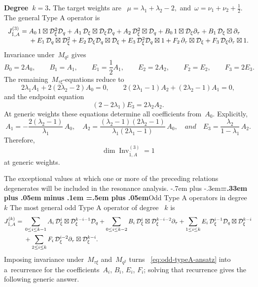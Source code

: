 \documentclass[12pt,a4paper]{amsart}
\makeatletter
\providecommand{\headspaces}{\spaceskip=.33em plus .05em minus .1em \xspaceskip=.5em plus .05em}
\def\subsubsection{\@startsection{subsubsection}{3}{0pt}{-1ex \@plus -.4ex \@minus -.2ex}%
  {-.7em plus -.3em}{\normalfont\normalsize\bfseries\boldmath\headspaces}}
\theoremstyle{thm}
\theoremstyle{definition}
\newcommand {\Dq}{\cD_q}
\newcommand {\Dxi}{\cD_\xi}
\makeatother
\begin{document}
{\bf Degree~\(k=3\).} The target weights are~%
$
\mu=\lambda_1+\lambda_2-2,
$ and~$\omega=\nu_1+\nu_2+\frac12.$ The general Type A operator is
\[
\begin{array}{r@{}l}
J_{\bar1,A}^{(3)}
={}&
A_0\,1\boxtimes \Dxi^2\Dq
+
A_1\,\Dxi\boxtimes \Dxi\Dq
+
A_2\,\Dxi^2\boxtimes \Dq
+
B_0\,1\boxtimes \Dxi\partial_\tau
+
B_1\,\Dxi\boxtimes \partial_\tau
\\
&{}+
E_1\,\Dq\boxtimes \Dxi^2
+
E_2\,\Dxi\Dq\boxtimes \Dxi
+
E_3\,\Dxi^2\Dq\boxtimes1
+
F_2\,\partial_\tau\boxtimes \Dxi
+
F_3\,\Dxi\partial_\tau\boxtimes1.
\end{array}
\]
Invariance under~\(M_{q^2}\) gives
\[
B_0=2A_0,
\qquad
B_1=A_1,
\qquad
E_1=\frac12A_1,
\qquad
E_2=2A_2,
\qquad
F_2=E_2,
\qquad
F_3=2E_3.
\]
The remaining~\(M_{\tau\xi}\)-equations reduce to
\[
2\lambda_1A_1
+
2(2\lambda_2-2)A_0
=
0,
\qquad
2(2\lambda_1-1)A_2
+
(2\lambda_2-1)A_1
=
0,
\]
and the endpoint equation
\[
(2-2\lambda_1)E_3
=
2\lambda_2A_2.
\]
At generic weights these equations determine all coefficients from~\(A_0\). Explicitly,
\[
A_1
=
-\frac{2(\lambda_2-1)}{\lambda_1}\,A_0,
\quad
A_2
=
\frac{
(\lambda_2-1)(2\lambda_2-1)
}{
\lambda_1(2\lambda_1-1)
}\,A_0,
\quad { and } \quad
E_3
=
\frac{\lambda_2}{1-\lambda_1}\,A_2.
\]
Therefore,
\[
\dim\operatorname{Inv}_{\bar1,A}^{(3)}=1
\]
at generic weights.

The exceptional values at which one or more of the preceding
relations degenerates will be included in the resonance analysis.
\subsubsection{Odd Type A operators in degree $k$}
The most general odd Type A operator of degree~%
\(k\) is
\begin{align}
J_{\bar1,A}^{(k)}
={}&
\sum_{0\leq i\leq k-1}
A_i\,\Dxi^i\boxtimes \Dxi^{k-i-1}\Dq
+
\sum_{0\leq i\leq k-2}
B_i\,\Dxi^i\boxtimes \Dxi^{k-i-2}\partial_\tau
\nonumber+
\sum_{1\leq i\leq k}
E_i\,\Dxi^{i-1}\Dq\boxtimes \Dxi^{k-i}
\\& +
\sum_{2\leq i\leq k}
F_i\,\Dxi^{i-2}\partial_\tau\boxtimes \Dxi^{k-i}.
\label{eq:odd-typeA-ansatz}
\end{align}
Imposing invariance under~\(M_{\tau\xi}\) and~\(M_{q^2}\) turns~%
\eqref{eq:odd-typeA-ansatz} into a~recurrence for the coefficients~\(A_i\),
\(B_i\), \(E_i\), \(F_i\); solving that recurrence gives the following generic
answer.
\end{document}
